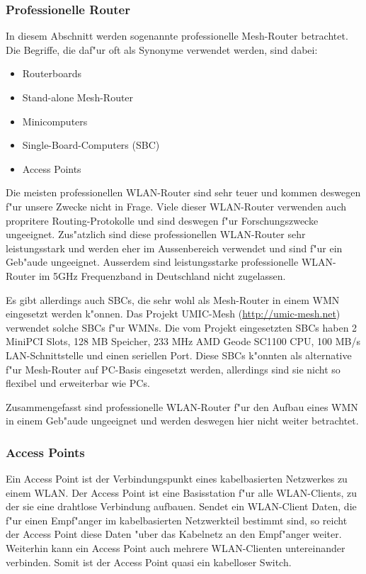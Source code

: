 \clearpage
\subsubsection{Professionelle Router}

In diesem Abschnitt werden sogenannte professionelle Mesh-Router betrachtet. 
Die Begriffe, die daf"ur oft als Synonyme verwendet werden, sind dabei: 

\begin{itemize}	
\item Routerboards
\item Stand-alone Mesh-Router 
\item Minicomputers 
\item Single-Board-Computers (SBC) 
\item Access Points
\end{itemize}

Die meisten professionellen WLAN-Router sind sehr teuer und kommen deswegen
f"ur unsere Zwecke nicht in Frage. Viele dieser WLAN-Router verwenden auch
propritere Routing-Protokolle und sind deswegen f"ur Forschungszwecke
ungeeignet. Zus"atzlich sind diese professionellen WLAN-Router sehr
leistungsstark und werden eher im Aussenbereich verwendet und
sind f"ur ein Geb"aude ungeeignet. Ausserdem sind leistungsstarke
professionelle WLAN-Router im 5GHz Frequenzband in Deutschland
nicht zugelassen.

Es gibt allerdings auch SBCs, die sehr wohl als Mesh-Router in einem WMN
eingesetzt werden k"onnen. Das Projekt UMIC-Mesh (\url{http://umic-mesh.net})
verwendet solche SBCs f"ur WMNs. Die vom Projekt eingesetzten SBCs
haben 2 MiniPCI Slots, 128 MB Speicher, 233 MHz AMD Geode SC1100 CPU,
100 MB/s LAN-Schnittstelle und einen seriellen Port. Diese SBCs k"onnten
als alternative f"ur Mesh-Router auf PC-Basis eingesetzt werden, allerdings
sind sie nicht so flexibel und erweiterbar wie PCs.

Zusammengefasst sind professionelle WLAN-Router f"ur den Aufbau eines
WMN in einem Geb"aude ungeeignet und werden deswegen hier nicht weiter betrachtet.

\subsubsection{Access Points}

Ein Access Point ist der Verbindungspunkt eines kabelbasierten
Netzwerkes zu einem WLAN. Der Access Point ist eine Basisstation f"ur alle
WLAN-Clients, zu der sie eine drahtlose Verbindung aufbauen.
Sendet ein WLAN-Client Daten, die f"ur einen Empf"anger im kabelbasierten
Netzwerkteil bestimmt sind, so reicht der Access Point diese Daten "uber
das Kabelnetz an den Empf"anger weiter. Weiterhin kann ein Access Point
auch mehrere WLAN-Clienten untereinander verbinden. Somit ist der Access Point
quasi ein kabelloser Switch.

